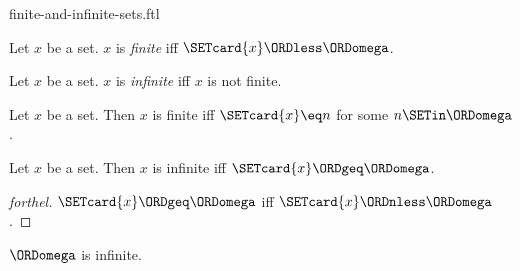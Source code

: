 \documentclass{naproche-library}
\begin{document}
\begin{smodule}[title=Finite and Infinite Sets]{finite-and-infinite-sets.ftl}

\begin{definition}[forthel,id=SET_THEORY_07_5346658235711488]
  Let $x$ be a set.
  $x$ is \emph{finite} iff $\SETcard{x} \ORDless \ORDomega$.
\end{definition}

\begin{definition}[forthel,id=SET_THEORY_07_8295412068777984]
  Let $x$ be a set.
  $x$ is \emph{infinite} iff $x$ is not finite.
\end{definition}

\begin{proposition}[forthel,id=SET_THEORY_07_3806229474312192]
  Let $x$ be a set.
  Then $x$ is finite iff $\SETcard{x} \eq n$ for some $n \SETin \ORDomega$.
\end{proposition}

\begin{proposition}[forthel,id=SET_THEORY_07_3174577070931968]
  Let $x$ be a set.
  Then $x$ is infinite iff $\SETcard{x} \ORDgeq \ORDomega$.
\end{proposition}
\begin{proof}[forthel]
  $\SETcard{x} \ORDgeq \ORDomega$ iff $\SETcard{x} \ORDnless \ORDomega$.
\end{proof}

\begin{proposition}[forthel,id=SET_THEORY_07_9154385075632368]
  $\ORDomega$ is infinite.
\end{proposition}
\end{smodule}
\end{document}
